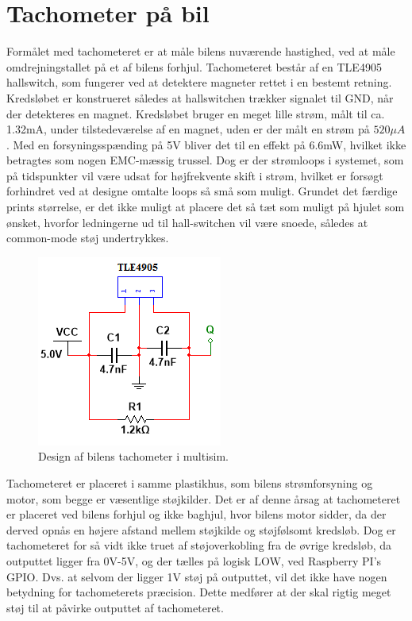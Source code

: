 \section{Tachometer på bil}

Formålet med tachometeret er at måle bilens nuværende hastighed, ved at måle omdrejningstallet på et af bilens forhjul. 
Tachometeret består af en TLE4905 \cite{lib:tle4905}
hallswitch, som fungerer ved at detektere magneter rettet i en bestemt retning. 
Kredsløbet er konstrueret således at hallswitchen trækker signalet til GND, når der detekteres en magnet. 
Kredsløbet bruger en meget lille strøm, målt til ca. 1.32mA, under tilstedeværelse af en magnet, uden er der målt en strøm på $520\mu A$. 
Med en forsyningsspænding på 5V bliver det til en effekt på 6.6mW, hvilket ikke betragtes som nogen EMC-mæssig trussel. 
Dog er der strømloops i systemet, som på tidspunkter vil være udsat for højfrekvente skift i strøm, hvilket er forsøgt forhindret ved at designe omtalte loops så små som muligt. 
Grundet det færdige prints størrelse, er det ikke muligt at placere det så tæt som muligt på hjulet som ønsket, hvorfor ledningerne ud til hall-switchen vil være snoede, således at common-mode støj undertrykkes.

\begin{figure}[h]
\centering
\includegraphics[scale=1]{../fig/billeder/tachometer_multisim.png}
\caption{Design af bilens tachometer i multisim.}
\label{fig:tachometer_multisim}
\end{figure}

Tachometeret er placeret i samme plastikhus, som bilens strømforsyning og motor, som begge er væsentlige støjkilder.
Det er af denne årsag at tachometeret er placeret ved bilens forhjul og ikke baghjul, hvor bilens motor sidder, da der derved opnås en højere afstand mellem støjkilde og støjfølsomt kredsløb.
Dog er tachometeret for så vidt ikke truet af støjoverkobling fra de øvrige kredsløb, da outputtet ligger fra 0V-5V, og der tælles på logisk LOW, ved Raspberry PI's GPIO. 
Dvs. at selvom der ligger 1V støj på outputtet, vil det ikke have nogen betydning for tachometerets præcision. 
Dette medfører at der skal rigtig meget støj til at påvirke outputtet af tachometeret. 

\clearpage